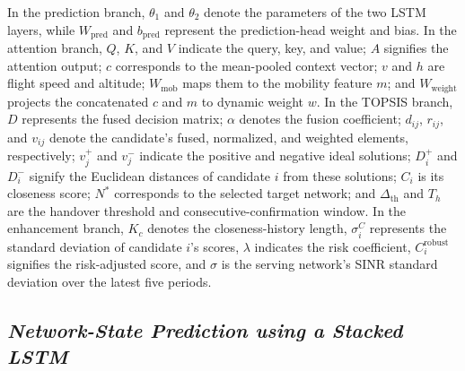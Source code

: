 \documentclass[10pt,a4paper]{article}
\begin{document}
In the prediction branch, $\theta_1$ and $\theta_2$ denote the parameters of the two LSTM layers, while $W_{\mathrm{pred}}$ and $b_{\mathrm{pred}}$ represent the prediction-head weight and bias. In the attention branch, $Q$, $K$, and $V$ indicate the query, key, and value; $A$ signifies the attention output; $c$ corresponds to the mean-pooled context vector; $v$ and $h$ are flight speed and altitude; $W_{\mathrm{mob}}$ maps them to the mobility feature $m$; and $W_{\mathrm{weight}}$ projects the concatenated $c$ and $m$ to dynamic weight $w$. In the TOPSIS branch, $D$ represents the fused decision matrix; $\alpha$ denotes the fusion coefficient; $d_{ij}$, $r_{ij}$, and $v_{ij}$ denote the candidate's fused, normalized, and weighted elements, respectively; $v_j^+$ and $v_j^-$ indicate the positive and negative ideal solutions; $D_i^+$ and $D_i^-$ signify the Euclidean distances of candidate $i$ from these solutions; $C_i$ is its closeness score; $N^*$ corresponds to the selected target network; and $\Delta_{\mathrm{th}}$ and $T_h$ are the handover threshold and consecutive-confirmation window. In the enhancement branch, $K_c$ denotes the closeness-history length, $\sigma_i^C$ represents the standard deviation of candidate $i$'s scores, $\lambda$ indicates the risk coefficient, $C_i^{\mathrm{robust}}$ signifies the risk-adjusted score, and $\sigma$ is the serving network's SINR standard deviation over the latest five periods.

\subsection{\textmd{\textit{Network-State Prediction using a Stacked LSTM}}}
\end{document}
